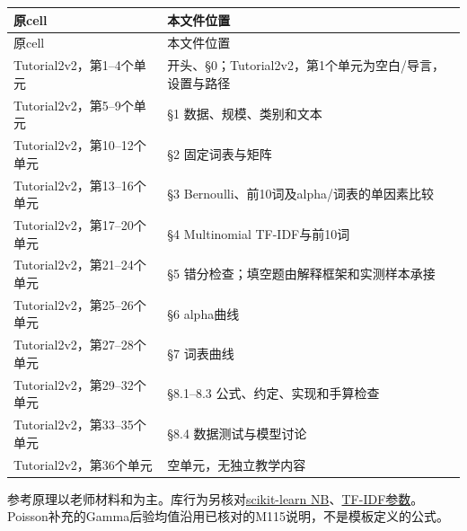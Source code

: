 \begingroup
\small\setlength{\tabcolsep}{3pt}
\renewcommand{\arraystretch}{1.22}
\begin{longtable}{@{}>{\raggedright\arraybackslash}p{}>{\raggedright\arraybackslash}p{}@{}}
\toprule
原cell & 本文件位置 \\
\midrule\endfirsthead
原cell & 本文件位置 \\
\midrule\endhead
\bottomrule\endfoot
Tutorial2v2，第1–4个单元 & 开头、§0；Tutorial2v2，第1个单元为空白/导言，设置与路径 \\
Tutorial2v2，第5–9个单元 & §1 数据、规模、类别和文本 \\
Tutorial2v2，第10–12个单元 & §2 固定词表与矩阵 \\
Tutorial2v2，第13–16个单元 & §3 Bernoulli、前10词及alpha/词表的单因素比较 \\
Tutorial2v2，第17–20个单元 & §4 Multinomial TF-IDF与前10词 \\
Tutorial2v2，第21–24个单元 & §5 错分检查；填空题由解释框架和实测样本承接 \\
Tutorial2v2，第25–26个单元 & §6 alpha曲线 \\
Tutorial2v2，第27–28个单元 & §7 词表曲线 \\
Tutorial2v2，第29–32个单元 & §8.1–8.3 公式、约定、实现和手算检查 \\
Tutorial2v2，第33–35个单元 & §8.4 数据测试与模型讨论 \\
Tutorial2v2，第36个单元 & 空单元，无独立教学内容 \\
\end{longtable}
\endgroup


参考原理以老师材料和为主。库行为另核对\href{https://scikit-learn.org/stable/modules/naive\_bayes.html}{scikit-learn NB}、\href{https://scikit-learn.org/stable/modules/generated/sklearn.feature\_extraction.text.TfidfTransformer.html}{TF-IDF参数}。Poisson补充的Gamma后验均值沿用已核对的M115说明，不是模板定义的公式。
